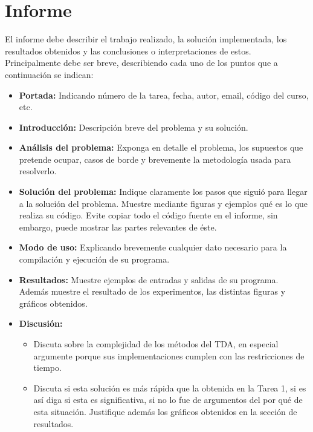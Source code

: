 \documentclass[dcc]{fcfmcourse}
\begin{document}
\section{Informe}

El informe debe describir el trabajo realizado, la solución implementada, los resultados obtenidos
y las conclusiones o interpretaciones de estos. Principalmente debe ser breve, describiendo cada uno
de los puntos que a continuación se indican:

\begin{itemize}
    \item \textbf{Portada:} Indicando número de la tarea, fecha, autor, email, código del curso, etc.
    \item \textbf{Introducción:} Descripción breve del problema y su solución.
    \item \textbf{Análisis del problema:} Exponga en detalle el problema, los supuestos que pretende ocupar, casos de borde y brevemente la metodología usada para resolverlo.
    \item \textbf{Solución del problema:} Indique claramente los pasos que siguió para llegar a la solución
del problema. Muestre mediante figuras y ejemplos qué es lo que realiza su código. Evite
copiar todo el código fuente en el informe, sin embargo, puede mostrar las partes relevantes
de éste.
\item \textbf{Modo de uso:} Explicando brevemente cualquier dato necesario para la compilación y
ejecución de su programa.
\item \textbf{Resultados:} Muestre ejemplos de entradas y salidas de su programa. Además muestre el resultado de los experimentos, las distintas figuras y gráficos obtenidos.
\item \textbf{Discusión:} 
\begin{itemize}
    \item Discuta sobre la complejidad de los métodos del TDA, en especial argumente porque sus implementaciones cumplen con las restricciones de tiempo. 
    \item Discuta si esta solución es más rápida que la obtenida en la Tarea 1, si es así diga si esta es significativa, si no lo fue de argumentos del por qué de esta situación. Justifique además los gráficos obtenidos en la sección de resultados.
\end{itemize}



\end{itemize}
\end{document}
